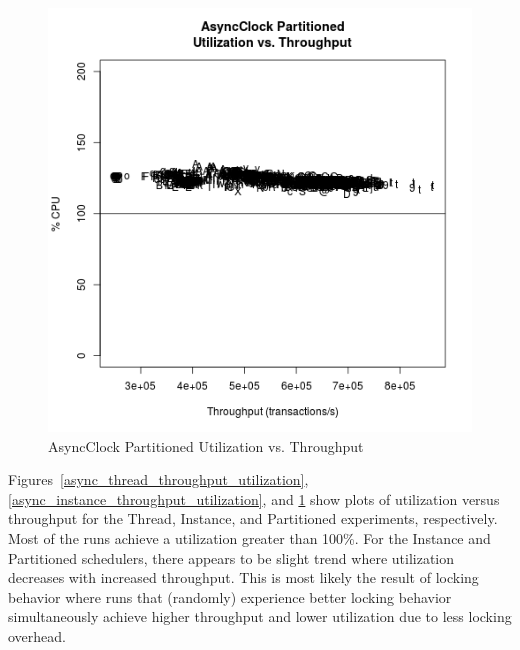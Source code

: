 \begin{figure}[H]
\center
\includegraphics[height=.4\textheight]{async_partitioned_throughput_utilization.png}
\caption{AsyncClock Partitioned Utilization vs. Throughput}
\label{async_partitioned_throughput_utilization}
\end{figure}

Figures~\ref{async_thread_throughput_utilization}, \ref{async_instance_throughput_utilization}, and \ref{async_partitioned_throughput_utilization} show plots of utilization versus throughput for the Thread, Instance, and Partitioned experiments, respectively.
Most of the runs achieve a utilization greater than 100\%.
For the Instance and Partitioned schedulers, there appears to be slight trend where utilization decreases with increased throughput.
This is most likely the result of locking behavior where runs that (randomly) experience better locking behavior simultaneously achieve higher throughput and lower utilization due to less locking overhead.

